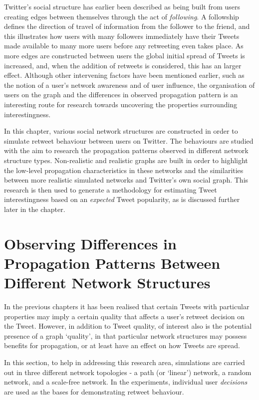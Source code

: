Twitter's social structure has earlier been described as being built from users creating edges between themselves through the act of \textit{following}. A followship defines the direction of travel of information from the follower to the friend, and this illustrates how users with many followers immediately have their Tweets made available to many more users before any retweeting even takes place. As more edges are constructed between users the global initial spread of Tweets is increased, and, when the addition of retweets is considered, this has an larger effect. Although other intervening factors have been mentioned earlier, such as the notion of a user's network awareness and of user influence, the organisation of users on the graph and the differences in observed propagation pattern is an interesting route for research towards uncovering the properties surrounding interestingness.

In this chapter, various social network structures are constructed in order to simulate retweet behaviour between users on Twitter. The behaviours are studied with the aim to research the propagation patterns observed in different network structure types. Non-realistic and realistic graphs are built in order to highlight the low-level propagation characteristics in these networks and the similarities between more realistic simulated networks and Twitter's own social graph. This research is then used to generate a methodology for estimating Tweet interestingness based on an \textit{expected} Tweet popularity, as is discussed further later in the chapter.


\section{Observing Differences in Propagation Patterns Between Different Network Structures}
In the previous chapters it has been realised that certain Tweets with particular properties may imply a certain quality that affects a user's retweet decision on the Tweet. However, in addition to Tweet quality, of interest also is the potential presence of a graph `quality', in that particular network structures may possess benefits for propagation, or at least have an effect on how Tweets are spread.

In this section, to help in addressing this research area, simulations are carried out in three different network topologies - a path (or `linear') network, a random network, and a scale-free network. In the experiments, individual user \textit{decisions} are used as the bases for demonstrating retweet behaviour.  


